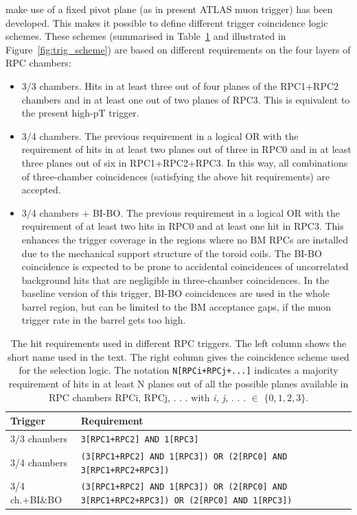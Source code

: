 make use of a fixed pivot plane (as in present ATLAS muon trigger) has been developed.
This makes it possible to define different trigger coincidence logic schemes.
\newpage
\noindent 
These schemes (summarised in Table~\ref{tab:trig_scheme} and illustrated in Figure~\ref{fig:trig_scheme}) are based on different requirements on the  four layers of RPC chambers:
\begin{itemize}
	\item 3/3 chambers. Hits in at least three out of four planes of the RPC1+RPC2 chambers
and in at least one out of two planes of RPC3. This is equivalent to the present high-pT
trigger.
	\item 3/4 chambers. The previous requirement in a logical OR with the requirement of
hits in at least two planes out of three in RPC0 and in at least three planes out of six
in RPC1+RPC2+RPC3. In this way, all combinations of three-chamber coincidences
(satisfying the above hit requirements) are accepted.
	\item 3/4 chambers + BI-BO. The previous requirement in a logical OR with the requirement
of at least two hits in RPC0 and at least one hit in RPC3. This enhances the
trigger coverage in the regions where no BM RPCs are installed due to the mechanical
support structure of the toroid coils. The BI-BO coincidence is expected to be
prone to accidental coincidences of uncorrelated background hits that are negligible
in three-chamber coincidences. In the baseline version of this trigger, BI-BO coincidences
are used in the whole barrel region, but can be limited to the BM acceptance
gaps, if the muon trigger rate in the barrel gets too high.
\end{itemize}
\begin{table}[h]
	\begin{center}
		\begin{tabular}{lp{}}
			\textbf{Trigger}  & \textbf{Requirement} \\
			\hline 
			3/3 chambers     & \scriptsize{\texttt{3[RPC1+RPC2] AND 1[RPC3]}} \\
			3/4 chambers     & \scriptsize{\texttt{(3[RPC1+RPC2] AND 1[RPC3]) OR (2[RPC0] AND 3[RPC1+RPC2+RPC3])}}\\
			3/4 ch.+BI\&BO    & \scriptsize{\texttt{(3[RPC1+RPC2] AND 1[RPC3]) OR (2[RPC0] AND 3[RPC1+RPC2+RPC3]) \hspace{2cm} OR (2[RPC0] AND 1[RPC3])}}\\
			\hline 
		\end{tabular} 
		\caption{The hit requirements used in different RPC triggers. The left column shows the short name used in the text. The right column gives the coincidence scheme used for the selection logic. The notation \texttt{N[RPCi+RPCj+...]} indicates a majority requirement of hits in at least N planes out of all the possible planes available in RPC chambers RPCi, RPCj, . . . with \textit{i, j,} . . . \textit{$\in$} $\{0, 1, 2, 3\}$.} 
		\label{tab:trig_scheme}
	\end{center} 
\end{table} 
